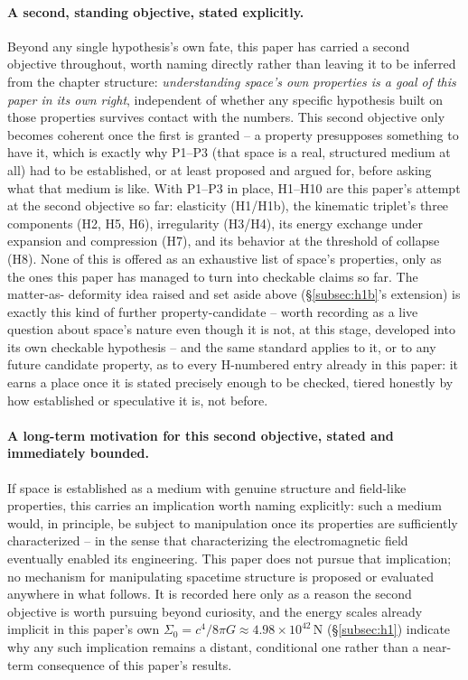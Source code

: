 \documentclass[12pt, a4paper]{article}
\begin{document}
\paragraph{A second, standing objective, stated explicitly.} Beyond
any single hypothesis's own fate, this paper has carried a second
objective throughout, worth naming directly rather than leaving it
to be inferred from the chapter structure: \emph{understanding
space's own properties is a goal of this paper in its own right},
independent of whether any specific hypothesis built on those
properties survives contact with the numbers. This second objective
only becomes coherent once the first is granted -- a property
presupposes something to have it, which is exactly why P1--P3 (that
space is a real, structured medium at all) had to be established, or
at least proposed and argued for, before asking what that medium is
like. With P1--P3 in place, H1--H10 are this paper's attempt at the
second objective so far: elasticity (H1/H1b), the kinematic triplet's
three components (H2, H5, H6), irregularity (H3/H4), its energy
exchange under expansion and compression (H7), and its behavior at
the threshold of collapse (H8). None of this is offered as an
exhaustive list of space's properties, only as the ones this paper
has managed to turn into checkable claims so far. The matter-as-
deformity idea raised and set aside above (\S\ref{subsec:h1b}'s
extension) is exactly this kind of further property-candidate --
worth recording as a live question about space's nature even though
it is not, at this stage, developed into its own checkable hypothesis
-- and the same standard applies to it, or to any future candidate
property, as to every H-numbered entry already in this paper: it
earns a place once it is stated precisely enough to be checked, tiered
honestly by how established or speculative it is, not before.

\paragraph{A long-term motivation for this second objective, stated
and immediately bounded.} If space is established as a medium with
genuine structure and field-like properties, this carries an
implication worth naming explicitly: such a medium would, in
principle, be subject to manipulation once its properties are
sufficiently characterized -- in the sense that characterizing the
electromagnetic field eventually enabled its engineering. This paper
does not pursue that implication; no mechanism for manipulating
spacetime structure is proposed or evaluated anywhere in what
follows. It is recorded here only as a reason the second objective is
worth pursuing beyond curiosity, and the energy scales already
implicit in this paper's own $\Sigma_0=c^4/8\pi G\approx4.98\times
10^{42}\,\mathrm{N}$ (\S\ref{subsec:h1}) indicate why any such
implication remains a distant, conditional one rather than a near-term
consequence of this paper's results.
\end{document}
